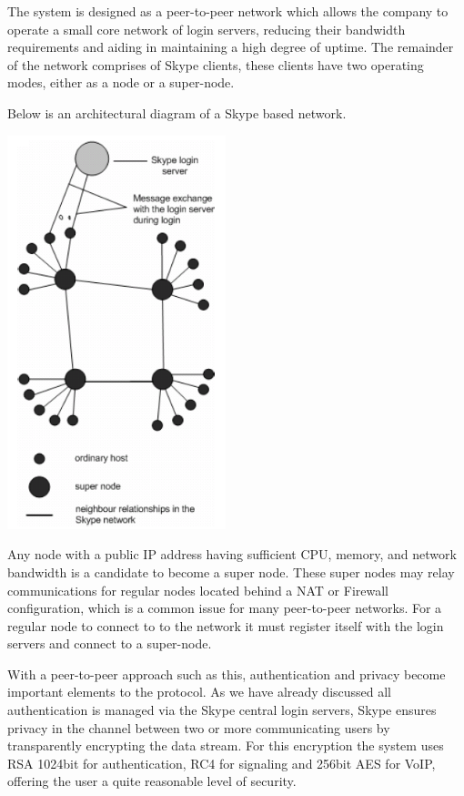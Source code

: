The system is designed as a peer-to-peer network which allows the company to operate a small core network of login servers, reducing their bandwidth requirements and aiding in maintaining a high degree of uptime. The remainder of the network comprises of Skype clients, these clients have two operating modes, either as a node or a super-node. 

Below is an architectural diagram of a Skype based network.

\begin{center}
	\includegraphics[width=2.5in]{images/Skype_network2.png}
\end{center}

Any node with a public IP address having sufficient CPU, memory, and network bandwidth is a candidate to become a super node\cite{website:BasetSchulzrinne}. These super nodes may relay communications for regular nodes located behind a NAT or Firewall configuration, which is a common issue for many peer-to-peer networks. For a regular node to connect to to the network it must register itself with the login servers and connect to a super-node.

With a peer-to-peer approach such as this, authentication and privacy become important elements to the protocol. As we have already discussed all authentication is managed via the Skype central login servers, Skype ensures privacy in the channel between two or more communicating users by transparently encrypting the data stream. For this encryption the system uses RSA 1024bit for authentication, RC4 for signaling and 256bit AES for VoIP, offering the user a quite reasonable level of security\cite{website:Fabrice05}. 

